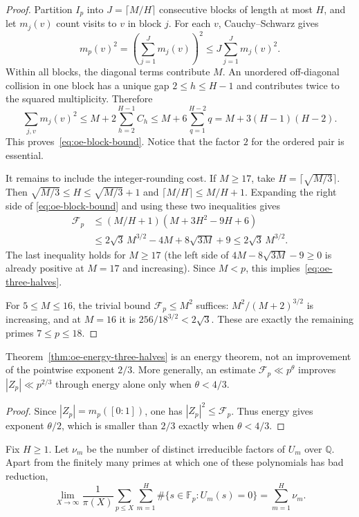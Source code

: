 \begin{proof}
Partition $I_p$ into $J=\lceil M/H\rceil$ consecutive blocks of length at
most $H$, and let $m_j(v)$ count visits to $v$ in block $j$.  For each $v$,
Cauchy--Schwarz gives
\[
 m_p(v)^2=\left(\sum_{j=1}^Jm_j(v)\right)^2
 \le J\sum_{j=1}^Jm_j(v)^2.
\]
Within all blocks, the diagonal terms contribute $M$.  An unordered
off-diagonal collision in one block has a unique gap $2\le h\le H-1$ and
contributes twice to the squared multiplicity.  Therefore
\[
 \sum_{j,v}m_j(v)^2
 \le M+2\sum_{h=2}^{H-1}C_h
 \le M+6\sum_{q=1}^{H-2}q
 =M+3(H-1)(H-2).
\]
This proves~\eqref{eq:oe-block-bound}.  Notice that the factor $2$ for the
ordered pair is essential.

It remains to include the integer-rounding cost.  If $M\ge17$, take
$H=\lceil\sqrt{M/3}\rceil$.  Then
$\sqrt{M/3}\le H\le\sqrt{M/3}+1$ and
$\lceil M/H\rceil\le M/H+1$.  Expanding the right side of
\eqref{eq:oe-block-bound} and using these two inequalities gives
\begin{align*}
 \mathcal F_p
 &\le (M/H+1)(M+3H^2-9H+6)\\
 &\le2\sqrt3\,M^{3/2}-4M+8\sqrt{3M}+9
 \le2\sqrt3\,M^{3/2}.
\end{align*}
The last inequality holds for $M\ge17$ (the left side of
$4M-8\sqrt{3M}-9\ge0$ is already positive at $M=17$ and increasing).
Since $M<p$, this implies~\eqref{eq:oe-three-halves}.

For $5\le M\le16$, the trivial bound $\mathcal F_p\le M^2$ suffices:
$M^2/(M+2)^{3/2}$ is increasing, and at $M=16$ it is
$256/18^{3/2}<2\sqrt3$.  These are exactly the remaining primes $7\le p\le18$.
\end{proof}

\begin{corollary}
\label{cor:oe-pointwise-position}
Theorem~\ref{thm:oe-energy-three-halves} is an energy theorem, not an
improvement of the pointwise exponent $2/3$.  More generally, an estimate
$\mathcal F_p\ll p^\theta$ improves $|Z_p|\ll p^{2/3}$ through energy alone
only when $\theta<4/3$.
\end{corollary}

\begin{proof}
Since $|Z_p|=m_p([0:1])$, one has $|Z_p|^2\le\mathcal F_p$.  Thus energy
gives exponent $\theta/2$, which is smaller than $2/3$ exactly when
$\theta<4/3$.
\end{proof}

\begin{proposition}
\label{prop:oe-fixed-H-chebotarev}
Fix $H\ge1$.  Let $\nu_m$ be the number of distinct irreducible factors of
$U_m$ over $\mathbb Q$.  Apart from the finitely many primes at which one of
these polynomials has bad reduction,
\[
 \lim_{X\to\infty}\frac1{\pi(X)}
 \sum_{p\le X}\sum_{m=1}^H
 \#\{s\in\mathbb F_p:U_m(s)=0\}
 =\sum_{m=1}^H\nu_m.
\]
\end{proposition}

